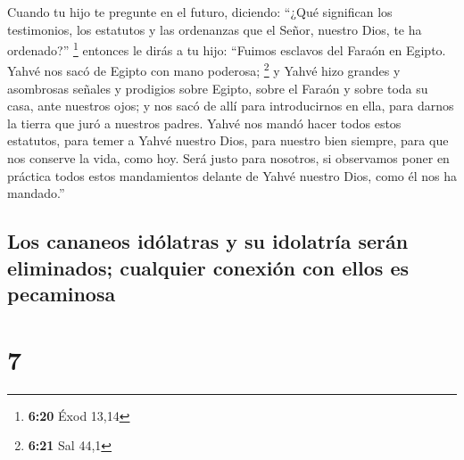  Cuando tu hijo te pregunte en el futuro, diciendo:
``¿Qué significan los testimonios, los estatutos y las ordenanzas que el
Señor, nuestro Dios, te ha ordenado?'' \footnote{\textbf{6:20} Éxod
  13,14}  entonces le dirás a tu hijo: ``Fuimos esclavos
del Faraón en Egipto. Yahvé nos sacó de Egipto con mano poderosa;
\footnote{\textbf{6:21} Sal 44,1}  y Yahvé hizo grandes y
asombrosas señales y prodigios sobre Egipto, sobre el Faraón y sobre
toda su casa, ante nuestros ojos;  y nos sacó de allí
para introducirnos en ella, para darnos la tierra que juró a nuestros
padres.  Yahvé nos mandó hacer todos estos estatutos,
para temer a Yahvé nuestro Dios, para nuestro bien siempre, para que nos
conserve la vida, como hoy.  Será justo para nosotros, si
observamos poner en práctica todos estos mandamientos delante de Yahvé
nuestro Dios, como él nos ha mandado.''

\hypertarget{los-cananeos-iduxf3latras-y-su-idolatruxeda-seruxe1n-eliminados-cualquier-conexiuxf3n-con-ellos-es-pecaminosa}{%
\subsection{Los cananeos idólatras y su idolatría serán eliminados;
cualquier conexión con ellos es
pecaminosa}\label{los-cananeos-iduxf3latras-y-su-idolatruxeda-seruxe1n-eliminados-cualquier-conexiuxf3n-con-ellos-es-pecaminosa}}

\hypertarget{section-6}{%
\section{7}\label{section-6}}

